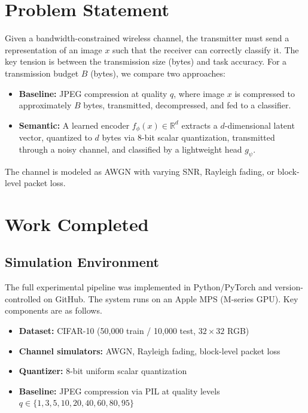 \documentclass[conference]{IEEEtran}
\begin{document}
\section{Problem Statement}

Given a bandwidth-constrained wireless channel, the transmitter must send a
representation of an image $x$ such that the receiver can correctly classify it.
The key tension is between the transmission size (bytes) and task accuracy.
For a transmission budget $B$ (bytes), we compare two approaches:

\begin{itemize}
    \item \textbf{Baseline:} JPEG compression at quality $q$, where image $x$
          is compressed to approximately $B$ bytes, transmitted, decompressed,
          and fed to a classifier.
    \item \textbf{Semantic:} A learned encoder $f_{\phi}(x) \in \mathbb{R}^{d}$
          extracts a $d$-dimensional latent vector, quantized to $d$ bytes via
          8-bit scalar quantization, transmitted through a noisy channel, and
          classified by a lightweight head $g_{\psi}$.
\end{itemize}

The channel is modeled as AWGN with varying SNR, Rayleigh fading, or
block-level packet loss.

\section{Work Completed}

\subsection{Simulation Environment}

The full experimental pipeline was implemented in Python/PyTorch and
version-controlled on GitHub. The system runs on an Apple MPS (M-series GPU).
Key components are as follows.

\begin{itemize}
    \item \textbf{Dataset:} CIFAR-10 (50{,}000 train / 10{,}000 test,
          $32{\times}32$ RGB)
    \item \textbf{Channel simulators:} AWGN, Rayleigh fading, block-level
          packet loss
    \item \textbf{Quantizer:} 8-bit uniform scalar quantization
    \item \textbf{Baseline:} JPEG compression via PIL at quality levels
          $q \in \{1, 3, 5, 10, 20, 40, 60, 80, 95\}$
\end{itemize}
\end{document}
